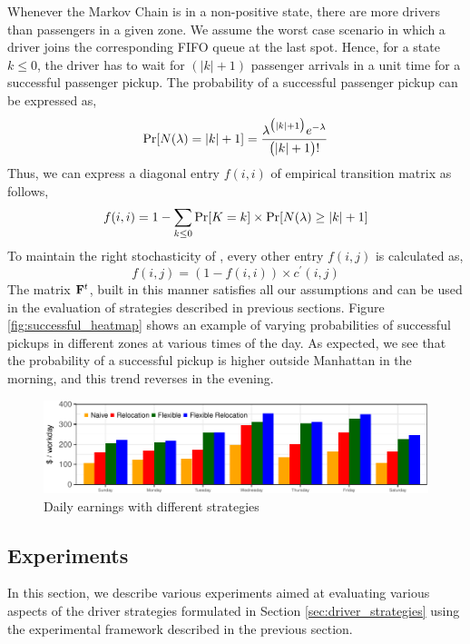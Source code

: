 Whenever the Markov Chain is in a non-positive state, there are more drivers than passengers in a given zone. We assume the worst case scenario in which a driver joins the corresponding FIFO queue at the last spot. Hence, for a state $k \leq 0$, the driver has to wait for $(|k| + 1)$ passenger arrivals in a unit time for a successful passenger pickup. The probability of a successful passenger pickup can be expressed as,
\begin{equation}
\Pr[N(\lambda) = |k| + 1] = \frac{\lambda^{\big(|k|+1\big)} e^{-\lambda}}{\big(|k| + 1\big)!}
\end{equation}
Thus, we can express a diagonal entry $f(i,i)$ of empirical transition matrix as follows,
\begin{equation}
f(i,i) = 1 - \sum_{k \leq 0} \Pr[K = k] \times \Pr[N(\lambda) \geq |k| + 1]
\end{equation}
To maintain the right stochasticity of {\empiricaltransitionmatrix}, every other entry $f(i,j)$ is calculated as,
\begin{equation}
f(i,j) = (1 - f(i,i)) \times c^\prime(i,j)
\end{equation}
The matrix ${\mathbf{F}}^t$, built in this manner satisfies all our assumptions and can be used in the evaluation of strategies described in previous sections. Figure \ref{fig:successful_heatmap} shows an example of varying probabilities of successful pickups in different zones at various times of the day. As expected, we see that the probability of a successful pickup is higher outside Manhattan in the morning, and this trend reverses in the evening.

\begin{figure}
	\centering
	\includegraphics{figures/daily_earnings.pdf}
	\caption{Daily earnings with different strategies}
	\label{fig:daily_earnings}
\end{figure}

\subsection{Experiments}
In this section, we describe various experiments aimed at evaluating various aspects of the driver strategies formulated in Section \ref{sec:driver_strategies} using the experimental framework described in the previous section.

